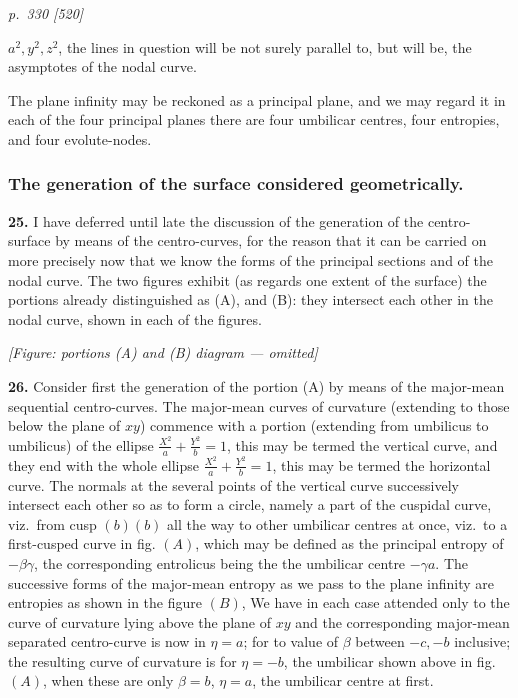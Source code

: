 \documentclass[11pt,a4paper]{article}
\theoremstyle{plain}
\theoremstyle{definition}
\begin{document}
\clearpage

\bigskip
\textit{p.~330 [520]}
\smallskip

$a^2, y^2, z^2$, the lines in question will be not surely parallel to, but will be, the asymptotes of the nodal curve.

The plane infinity may be reckoned as a principal plane, and we may regard it in each of the four principal planes there are four umbilicar centres, four entropies, and four evolute-nodes.

\subsubsection*{The generation of the surface considered geometrically.}

\textbf{25.} I have deferred until late the discussion of the generation of the centro-surface by means of the centro-curves, for the reason that it can be carried on more precisely now that we know the forms of the principal sections and of the nodal curve. The two figures exhibit (as regards one extent of the surface) the portions already distinguished as (A), and (B): they intersect each other in the nodal curve, shown in each of the figures.

\begin{center}
\textit{[Figure: portions (A) and (B) diagram --- omitted]}
\end{center}

\textbf{26.} Consider first the generation of the portion (A) by means of the major-mean sequential centro-curves. The major-mean curves of curvature (extending to those below the plane of $xy$) commence with a portion (extending from umbilicus to umbilicus) of the ellipse $\tfrac{X^2}{a} + \tfrac{Y^2}{b} = 1$, this may be termed the vertical curve, and they end with the whole ellipse $\tfrac{X^2}{a} + \tfrac{Y^2}{b} = 1$, this may be termed the horizontal curve. The normals at the several points of the vertical curve successively intersect each other so as to form a circle, namely a part of the cuspidal curve, viz.\ from cusp $(b) (b)$ all the way to other umbilicar centres at once, viz.\ to a first-cusped curve in fig. $(A)$, which may be defined as the principal entropy of $-\beta\gamma$, the corresponding entrolicus being the the umbilicar centre $-\gamma a$. The successive forms of the major-mean entropy as we pass to the plane infinity are entropies as shown in the figure $(B)$, We have in each case attended only to the curve of curvature lying above the plane of $xy$ and the corresponding major-mean separated centro-curve is now in $\eta = a$; for to value of $\beta$ between $-c, -b$ inclusive; the resulting curve of curvature is for $\eta = -b$, the umbilicar shown above in fig. $(A)$, when these are only $\beta = b$, $\eta = a$, the umbilicar centre at first.
\end{document}
